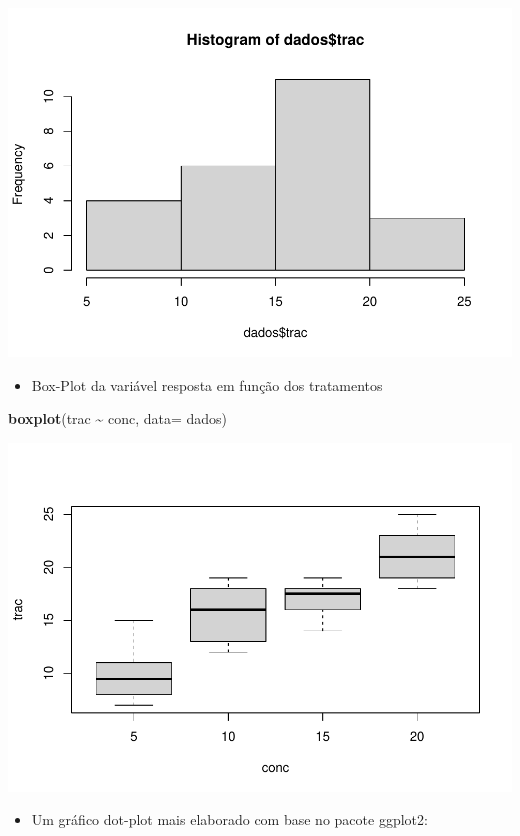 \documentclass[
]{book}
\newenvironment{Shaded}{\begin{snugshade}}{\end{snugshade}}
\newcommand{\AttributeTok}[1]{\textcolor[rgb]{0.13,0.29,0.53}{#1}}
\newcommand{\FunctionTok}[1]{\textcolor[rgb]{0.13,0.29,0.53}{\textbf{#1}}}
\newcommand{\NormalTok}[1]{#1}
\newcommand{\SpecialCharTok}[1]{\textcolor[rgb]{0.81,0.36,0.00}{\textbf{#1}}}
\providecommand{\tightlist}{%
  \setlength{\itemsep}{0pt}\setlength{\parskip}{0pt}}
\begin{document}
\includegraphics{_main_files/figure-latex/hist1-1.pdf}

\begin{itemize}
\tightlist
\item
  Box-Plot da variável resposta em função dos tratamentos
\end{itemize}

\begin{Shaded}
\begin{Highlighting}[]
\FunctionTok{boxplot}\NormalTok{(trac }\SpecialCharTok{\textasciitilde{}}\NormalTok{ conc, }\AttributeTok{data=}\NormalTok{ dados)}
\end{Highlighting}
\end{Shaded}

\includegraphics{_main_files/figure-latex/boxploty-1.pdf}

\begin{itemize}
\tightlist
\item
  Um gráfico dot-plot mais elaborado com base no pacote ggplot2:
\end{itemize}
\end{document}
